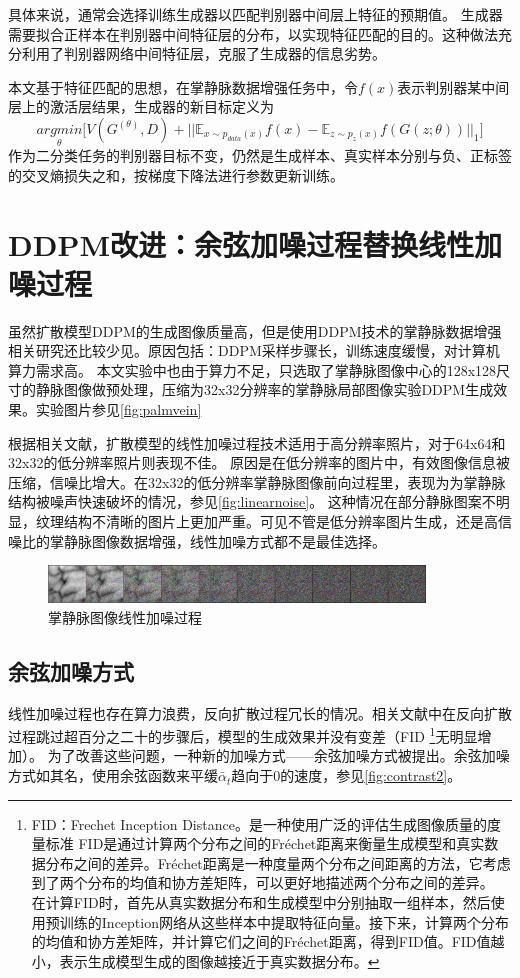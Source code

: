 具体来说，通常会选择训练生成器以匹配判别器中间层上特征的预期值。
生成器需要拟合正样本在判别器中间特征层的分布，以实现特征匹配的目的。这种做法充分利用了判别器网络中间特征层，克服了生成器的信息劣势。

本文基于特征匹配的思想，在掌静脉数据增强任务中，令$f(x)$表示判别器某中间层上的激活层结果，生成器的新目标定义为
\begin{equation}
    \underset{\theta}{argmin}\Big[V(G^{(\theta)},D)+\big|\big|\mathbb{E}_{x\sim p_{data}(x)}f(x)-\mathbb{E}_{z\sim p_{z}(x)}f(G(z;\theta))\big|\big|_1\Big]
\end{equation}
作为二分类任务的判别器目标不变，仍然是生成样本、真实样本分别与负、正标签的交叉熵损失之和，按梯度下降法进行参数更新训练。

\section{DDPM改进：余弦加噪过程替换线性加噪过程}
虽然扩散模型DDPM的生成图像质量高，但是使用DDPM技术的掌静脉数据增强相关研究还比较少见。原因包括：DDPM采样步骤长，训练速度缓慢，对计算机算力需求高。
本文实验中也由于算力不足，只选取了掌静脉图像中心的128x128尺寸的静脉图像做预处理，压缩为32x32分辨率的掌静脉局部图像实验DDPM生成效果。实验图片参见\autoref{fig:palmvein}

根据相关文献\cite{nichol2021improved}，扩散模型的线性加噪过程技术适用于高分辨率照片，对于64x64和32x32的低分辨率照片则表现不佳。
原因是在低分辨率的图片中，有效图像信息被压缩，信噪比增大。在32x32的低分辨率掌静脉图像前向过程里，表现为为掌静脉结构被噪声快速破坏的情况，参见\autoref{fig:linearnoise}。
这种情况在部分静脉图案不明显，纹理结构不清晰的图片上更加严重。可见不管是低分辨率图片生成，还是高信噪比的掌静脉图像数据增强，线性加噪方式都不是最佳选择。

\begin{figure}[!htbp]
    \centering
    \includegraphics[width=10cm]{image/chap04/linear_noise.jpg}
    \caption{掌静脉图像线性加噪过程}
    \label{fig:linearnoise}
\end{figure}

\subsection{余弦加噪方式}
线性加噪过程也存在算力浪费，反向扩散过程冗长的情况。相关文献\cite{nichol2021improved}中在反向扩散过程跳过超百分之二十的步骤后，模型的生成效果并没有变差（FID
\footnote{FID：Frechet Inception Distance。是一种使用广泛的评估生成图像质量的度量标准
FID是通过计算两个分布之间的Fréchet距离来衡量生成模型和真实数据分布之间的差异。Fréchet距离是一种度量两个分布之间距离的方法，它考虑到了两个分布的均值和协方差矩阵，可以更好地描述两个分布之间的差异。
在计算FID时，首先从真实数据分布和生成模型中分别抽取一组样本，然后使用预训练的Inception网络从这些样本中提取特征向量。接下来，计算两个分布的均值和协方差矩阵，并计算它们之间的Fréchet距离，得到FID值。FID值越小，表示生成模型生成的图像越接近于真实数据分布。
}无明显增加）。
为了改善这些问题，一种新的加噪方式——余弦加噪方式被提出。余弦加噪方式如其名，使用余弦函数来平缓$\bar{\alpha}_t$趋向于0的速度，参见\autoref{fig:contrast2}。


